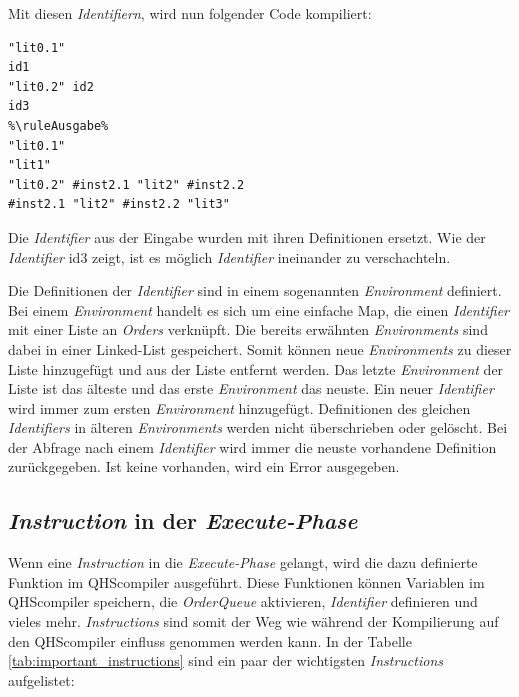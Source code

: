 Mit diesen \textit{Identifiern}, wird nun folgender Code kompiliert:

\begin{lstlisting}[language=QHS, caption=QHS-Code zur Veranschaulichung von \textit{Identifiern}]
%\ruleEingabe%
"lit0.1"
id1
"lit0.2" id2
id3
%\ruleAusgabe%
"lit0.1"
"lit1"
"lit0.2" #inst2.1 "lit2" #inst2.2
#inst2.1 "lit2" #inst2.2 "lit3"
\end{lstlisting}

Die \textit{Identifier} aus der Eingabe wurden mit ihren Definitionen ersetzt. Wie der \textit{Identifier} {\listingFont\selectfont id3} zeigt, ist es möglich \textit{Identifier} ineinander zu verschachteln.

Die Definitionen der \textit{Identifier} sind in einem sogenannten \textit{Environment} definiert.
Bei einem \textit{Environment} handelt es sich um eine einfache Map, die einen \textit{Identifier} mit einer Liste an \textit{Orders} verknüpft.
Die bereits erwähnten \textit{Environments} sind dabei in einer Linked-List gespeichert. Somit können neue \textit{Environments} zu dieser Liste hinzugefügt und aus der Liste entfernt werden.
Das letzte \textit{Environment} der Liste ist das älteste und das erste \textit{Environment} das neuste.
Ein neuer \textit{Identifier} wird immer zum ersten \textit{Environment} hinzugefügt. Definitionen des gleichen \textit{Identifiers} in älteren \textit{Environments} werden nicht überschrieben oder gelöscht.
Bei der Abfrage nach einem \textit{Identifier} wird immer die neuste vorhandene Definition zurückgegeben. Ist keine vorhanden, wird ein Error ausgegeben.

\subsection{\textit{Instruction} in der \textit{Execute-Phase}}
Wenn eine \textit{Instruction} in die \textit{Execute-Phase} gelangt, wird die dazu definierte Funktion im QHScompiler ausgeführt.
Diese Funktionen können Variablen im QHScompiler speichern, die \textit{OrderQueue} aktivieren, \textit{Identifier} definieren und vieles mehr.
\textit{Instructions} sind somit der Weg wie während der Kompilierung auf den QHScompiler einfluss genommen werden kann.
In der Tabelle \ref{tab:important_instructions} sind ein paar der wichtigsten \textit{Instructions} aufgelistet:

